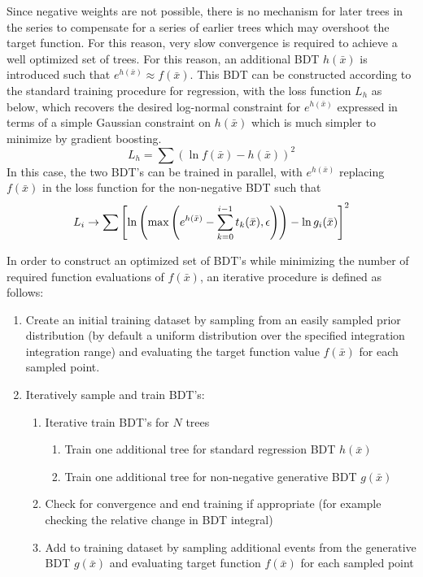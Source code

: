 \documentclass[a4paper,11pt]{article}
\begin{document}
Since negative weights are not possible, there is no mechanism for later trees in the series to compensate for a series of earlier trees which may overshoot the target function.  For this reason, very slow convergence is required to achieve a well optimized set of trees.  For this reason, an additional BDT $h(\bar x)$ is introduced such that $e^{h(\bar x)} \approx f(\bar x)$.  This BDT can be constructed according to the standard training procedure for regression, with the loss function $L_h$ as below, which recovers the desired log-normal constraint for $e^{h(\bar x)}$ expressed in terms of a simple Gaussian constraint on $h(\bar x)$ which is much simpler to minimize by gradient boosting.
\begin{equation}
 L_h = \sum\left(\ln f(\bar x) - h(\bar x)\right)^2
 \label{eqn:lognorm}
\end{equation}
In this case, the two BDT's can be trained in parallel, with $e^{h(\bar x)}$ replacing $f(\bar x)$ in the loss function for the non-negative BDT such that
\begin{equation}
 L_i \rightarrow \sum\left[\ln\left(\textnormal{max}\left(e^{h(\bar x)} - \sum_{k=0}^{i-1}t_k(\bar x),\epsilon\right)\right) - \ln g_i(\bar x)\right]^2
\end{equation}

In order to construct an optimized set of BDT's while minimizing the number of required function evaluations of $f(\bar x)$, an iterative procedure is defined as follows:
\begin{enumerate}
 \item Create an initial training dataset by sampling from an easily sampled prior distribution (by default a uniform distribution over the specified integration integration range) and evaluating the target function value $f(\bar x)$ for each sampled point.
 \item Iteratively sample and train BDT's:
 \begin{enumerate}
 \item Iterative train BDT's for $N$ trees
 \begin{enumerate}
  \item Train one additional tree for standard regression BDT $h(\bar x)$
  \item Train one additional tree for non-negative generative BDT $g(\bar x)$
  \end{enumerate}
  \item Check for convergence and end training if appropriate (for example checking the relative change in BDT integral)
  \item Add to training dataset by sampling additional events from the generative BDT $g(\bar x)$ and evaluating target function $f(\bar x)$ for each sampled point
 \end{enumerate}
\end{enumerate}
\end{document}
